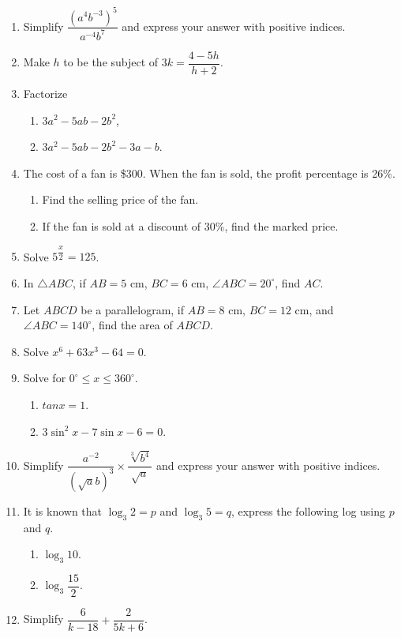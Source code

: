 \documentclass[12pt]{article}
\begin{document}
    \begin{enumerate}
        \item Simplify $\dfrac{(a^4b^{-3})^5}{a^{-4}b^7}$ and express your answer with positive indices.
        \item Make $h$ to be the subject of $3k=\dfrac{4-5h}{h+2}$.
        \item Factorize\begin{enumerate}
            \item $3a^2-5ab-2b^2$,
            \item $3a^2-5ab-2b^2-3a-b$.
        \end{enumerate}
        \item The cost of a fan is \$300. When the fan is sold, the profit percentage is 26\%.\begin{enumerate}
            \item Find the selling price of the fan.
            \item If the fan is sold at a discount of 30\%, find the marked price.
        \end{enumerate}
        \item Solve $5^\dfrac{x}{2}=125$.
        \item In $\triangle ABC$, if $AB=5$ cm, $BC=6$ cm, $\angle ABC=20^\circ$, find $AC$.
        \item Let $ABCD$ be a parallelogram, if $AB=8$ cm, $BC=12$ cm, and $\angle ABC=140^\circ$, find the area of $ABCD$.
        \item Solve $x^6+63x^3-64=0$.
        \item Solve for $0^\circ \leq  x \leq 360^\circ$.\begin{enumerate}
            \item $tan{x}=1$.
            \item $3\sin^2{x}-7\sin{x}-6=0$.
        \end{enumerate}
        \item Simplify $\dfrac{a^{-2}}{(\sqrt{a}b)^3}\times\dfrac{\sqrt[3]{b^4}}{\sqrt{a}}$ and express your answer with positive indices.
        \item It is known that $\log_3{2}=p$ and $\log_3{5}=q$, express the following  log using $p$ and $q$.\begin{enumerate}
            \item $\log_3{10}$.
            \item $\log_3{\dfrac{15}{2}}$.
        \end{enumerate}
        \item Simplify $\dfrac{6}{k-18}+\dfrac{2}{5k+6}$.

\end{enumerate}
\end{document}
